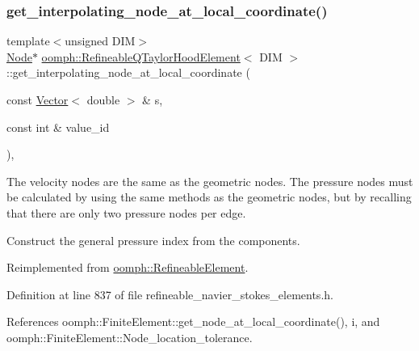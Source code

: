 \subsubsection{\texorpdfstring{get\+\_\+interpolating\+\_\+node\+\_\+at\+\_\+local\+\_\+coordinate()}{get\_interpolating\_node\_at\_local\_coordinate()}}
{\footnotesize\ttfamily template$<$unsigned D\+IM$>$ \\
\hyperlink{classoomph_1_1Node}{Node}$\ast$ \hyperlink{classoomph_1_1RefineableQTaylorHoodElement}{oomph\+::\+Refineable\+Q\+Taylor\+Hood\+Element}$<$ D\+IM $>$\+::get\+\_\+interpolating\+\_\+node\+\_\+at\+\_\+local\+\_\+coordinate (\begin{DoxyParamCaption}\item[{const \hyperlink{classoomph_1_1Vector}{Vector}$<$ double $>$ \&}]{s,  }\item[{const int \&}]{value\+\_\+id }\end{DoxyParamCaption})\hspace{0.3cm}{\ttfamily [inline]}, {\ttfamily [virtual]}}



The velocity nodes are the same as the geometric nodes. The pressure nodes must be calculated by using the same methods as the geometric nodes, but by recalling that there are only two pressure nodes per edge. 

Construct the general pressure index from the components. 

Reimplemented from \hyperlink{classoomph_1_1RefineableElement_ad920e66c00888c450f926f08c7793f78}{oomph\+::\+Refineable\+Element}.



Definition at line 837 of file refineable\+\_\+navier\+\_\+stokes\+\_\+elements.\+h.



References oomph\+::\+Finite\+Element\+::get\+\_\+node\+\_\+at\+\_\+local\+\_\+coordinate(), i, and oomph\+::\+Finite\+Element\+::\+Node\+\_\+location\+\_\+tolerance.

\mbox{\label{classoomph_1_1RefineableQTaylorHoodElement_af9358dd7b65ca4a1005980d50986db0d}} 
